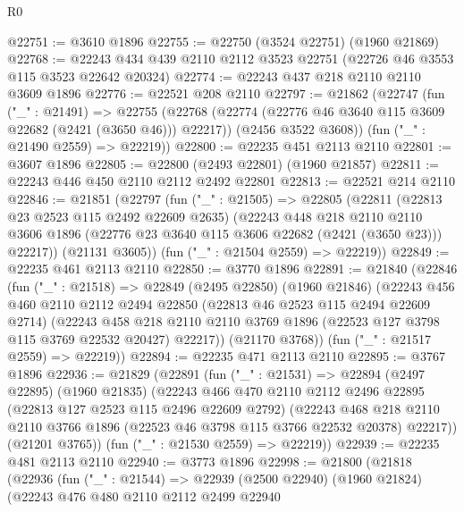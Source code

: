 \begin{lexlean}{R0}
\begin{coremodule}
@22751 := @3610 @1896
@22755 := @22750 (@3524 @22751) (@1960 @21869)
@22768 := @22243 @434 @439 @2110 @2112 @3523 @22751 (@22726 @46 @3553 @115 @3523 @22642 @20324)
@22774 := @22243 @437 @218 @2110 @2110 @3609 @1896
@22776 := @22521 @208 @2110
@22797 := @21862
    (@22747
      (fun ("_" : @21491) =>
      @22755
        (@22768 (@22774 (@22776 @46 @3640 @115 @3609 @22682 (@2421 (@3650 @46))) @22217))
        (@2456 @3522 @3608))
      (fun ("_" : @21490 @2559) => @22219))
@22800 := @22235 @451 @2113 @2110
@22801 := @3607 @1896
@22805 := @22800 (@2493 @22801) (@1960 @21857)
@22811 := @22243 @446 @450 @2110 @2112 @2492 @22801
@22813 := @22521 @214 @2110
@22846 := @21851
    (@22797
      (fun ("_" : @21505) =>
      @22805
        (@22811
          (@22813 @23 @2523 @115 @2492 @22609 @2635)
          (@22243
            @448
            @218
            @2110
            @2110
            @3606
            @1896
            (@22776 @23 @3640 @115 @3606 @22682 (@2421 (@3650 @23)))
            @22217))
        (@21131 @3605))
      (fun ("_" : @21504 @2559) => @22219))
@22849 := @22235 @461 @2113 @2110
@22850 := @3770 @1896
@22891 := @21840
    (@22846
      (fun ("_" : @21518) =>
      @22849
        (@2495 @22850)
        (@1960 @21846)
        (@22243
          @456
          @460
          @2110
          @2112
          @2494
          @22850
          (@22813 @46 @2523 @115 @2494 @22609 @2714)
          (@22243
            @458
            @218
            @2110
            @2110
            @3769
            @1896
            (@22523 @127 @3798 @115 @3769 @22532 @20427)
            @22217))
        (@21170 @3768))
      (fun ("_" : @21517 @2559) => @22219))
@22894 := @22235 @471 @2113 @2110
@22895 := @3767 @1896
@22936 := @21829
    (@22891
      (fun ("_" : @21531) =>
      @22894
        (@2497 @22895)
        (@1960 @21835)
        (@22243
          @466
          @470
          @2110
          @2112
          @2496
          @22895
          (@22813 @127 @2523 @115 @2496 @22609 @2792)
          (@22243
            @468
            @218
            @2110
            @2110
            @3766
            @1896
            (@22523 @46 @3798 @115 @3766 @22532 @20378)
            @22217))
        (@21201 @3765))
      (fun ("_" : @21530 @2559) => @22219))
@22939 := @22235 @481 @2113 @2110
@22940 := @3773 @1896
@22998 := @21800
    (@21818
      (@22936
        (fun ("_" : @21544) =>
        @22939
          (@2500 @22940)
          (@1960 @21824)
          (@22243
            @476
            @480
            @2110
            @2112
            @2499
            @22940

\end{coremodule}
\end{lexlean}
